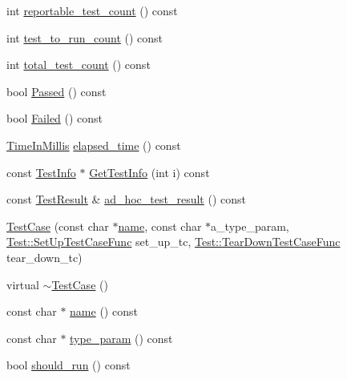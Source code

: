 \begin{DoxyCompactItemize}
int \hyperlink{classtesting_1_1_test_case_a7693150fa71d460a19b291ed6f5c18bd}{reportable\-\_\-test\-\_\-count} () const 
\item 
int \hyperlink{classtesting_1_1_test_case_a47de0cf87858370388275c9d995f1ff4}{test\-\_\-to\-\_\-run\-\_\-count} () const 
\item 
int \hyperlink{classtesting_1_1_test_case_ac7b2ed22822735b7b9ae2740162332c9}{total\-\_\-test\-\_\-count} () const 
\item 
bool \hyperlink{classtesting_1_1_test_case_ad093a04334d7eb8d707a7f1a321b040f}{Passed} () const 
\item 
bool \hyperlink{classtesting_1_1_test_case_a5c0922d310f860e78cca7e215f2fa0e4}{Failed} () const 
\item 
\hyperlink{namespacetesting_a992de1d091ce660f451d1e8b3ce30fd6}{Time\-In\-Millis} \hyperlink{classtesting_1_1_test_case_a80f163d2826ba8586fffb41e8d686727}{elapsed\-\_\-time} () const 
\item 
const \hyperlink{classtesting_1_1_test_info}{Test\-Info} $\ast$ \hyperlink{classtesting_1_1_test_case_a9a7d5757d4b352cda2dddd0fda714a88}{Get\-Test\-Info} (int i) const 
\item 
const \hyperlink{classtesting_1_1_test_result}{Test\-Result} \& \hyperlink{classtesting_1_1_test_case_a3993481a8f0c2253653b5e1ec5934432}{ad\-\_\-hoc\-\_\-test\-\_\-result} () const 
\item 
\hyperlink{classtesting_1_1_test_case_a8a43b04703bfc7d56597fcb9b76ffbf5}{Test\-Case} (const char $\ast$\hyperlink{classtesting_1_1_test_case_af4dfd4ece8e66520a30e6a9fbd9d43aa}{name}, const char $\ast$a\-\_\-type\-\_\-param, \hyperlink{classtesting_1_1_test_a5f2a051d1d99c9b784c666c586186cf9}{Test\-::\-Set\-Up\-Test\-Case\-Func} set\-\_\-up\-\_\-tc, \hyperlink{classtesting_1_1_test_aa0f532e93b9f3500144c53f31466976c}{Test\-::\-Tear\-Down\-Test\-Case\-Func} tear\-\_\-down\-\_\-tc)
\item 
virtual \hyperlink{classtesting_1_1_test_case_ae8afec89feb954cc84317bd92c9b1bbe}{$\sim$\-Test\-Case} ()
\item 
const char $\ast$ \hyperlink{classtesting_1_1_test_case_af4dfd4ece8e66520a30e6a9fbd9d43aa}{name} () const 
\item 
const char $\ast$ \hyperlink{classtesting_1_1_test_case_a2052c095bc6ac9c0ab1cae6f0e2d9fc9}{type\-\_\-param} () const 
\item 
bool \hyperlink{classtesting_1_1_test_case_a0e49de754452943d88e3083e6cdded00}{should\-\_\-run} () const 
\item 

\end{DoxyCompactItemize}
